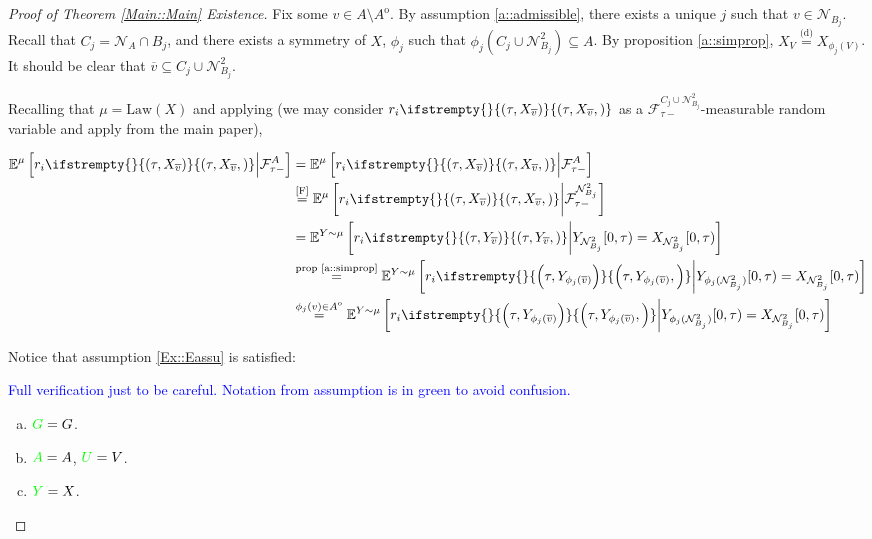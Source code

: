 \documentclass[12pt]{article}
\newcommand{\mb}{\mathbb}
\newcommand{\mc}{\mathcal}
\newcommand{\ov}{\overline}
\newcommand{\os}{\overset}
\newcommand{\te}{\text}
\newcommand{\tb}{\textcolor{blue}}
\newcommand{\tg}{\textcolor{green}}
\newcommand{\ind}{\hspace{24pt}}
\newcommand{\exmu}[2]{\mb{E}^{#1}\left[#2\right]}	%
\newcommand{\deq}{\overset{\text{(d)}}{=}}			%
\newcommand{\neigh}[1]{\mc{N}_{#1}}				%
\newcommand{\dneigh}[1]{\mc{N}^2_{#1}}			%
\newcommand{\cl}[1]{\ov{#1}}						%
\newcommand{\Xf}{X}									%
\newcommand{\rate}{r}								%
\newcommand{\F}{\mc{F}}								%
\newcommand{\m}{\mu}								%
\newcommand{\vind}[1]{_{#1}}						%
\newcommand{\tmi}[1]{#1}							%
\newcommand{\vpara}[1]{^{#1}}						%
\newcommand{\stpara}[1]{_{#1}}						%
\newcommand{\tpara}[1]{_{#1}}						%
\newcommand{\tmepro}[3]{
\ifstrempty{#3}{
	\left(#1,#2\right)}{
	\left(#1,#2,#3\right)}}							%
\newcommand{\Xg}{Y}									%
\newcommand{\inte}[1]{{#1}^\mathrm{o}}				%
\newcommand{\rt}{\tau}								%
\newcommand{\law}{\te{Law}}							%
\begin{document}
\begin{proof}[Proof of Theorem \ref{Main::Main} Existence]
\ind Fix some \(v \in A\setminus \inte{A}\). By assumption \ref{a::admissible}, there exists a unique \(j\) such that \(v \in \neigh{B_j}\). Recall that \(C_j = \neigh{A}\cap B_j\), and there exists a symmetry of \(\Xf\), \(\phi_j\) such that \(\phi_j(C_j\cup\dneigh{B_j}) \subseteq A\). By proposition \ref{a::simprop}, \(\Xf\vind{V} \deq \Xf\vind{\phi_j(V)}\). It should be clear that \(\cl{v} \subseteq C_j\cup\dneigh{B_j}\).

\ind Recalling that \(\m = \law(\Xf)\) and applying \cite[theorem \ref{F-CI::CI}]{F} (we may consider \(\rate\stpara{i}\tmepro{\rt}{\Xf\vind{\cl{v}}}{}\) as a \(\F\vpara{C_j\cup\dneigh{B_j}}\tpara{\rt-}\)-measurable random variable and apply \cite[lemma \ref{F-TL::Props}(e)]{F} from the main paper),

\begin{align*}
\exmu{\m}{\rate\stpara{i}\tmepro{\rt}{\Xf\vind{\cl{v}}}{}\middle|\F\vpara{A}\tpara{\rt-}} &=\exmu{\m}{\rate\stpara{i}\tmepro{\rt}{\Xf\vind{\cl{v}}}{}\middle|\F\vpara{A}\tpara{\rt-}}\\
&\os{\te{\cite[thm \ref{F-CI::CI}]{F}}}{=} \exmu{\m}{\rate\stpara{i}\tmepro{\rt}{\Xf\vind{\cl{v}}}{}\middle|\F\vpara{\dneigh{B_j}}\tpara{\rt-}}\\
&=\exmu{\Xg\sim \m}{\rate\stpara{i}\tmepro{\rt}{\Xg\vind{\cl{v}}}{}\middle|\Xg\vind{\dneigh{B_j}}\tmi{[0,\rt)} = \Xf\vind{\dneigh{B_j}}\tmi{[0,\rt)}}\\
&\os{\te{prop \ref{a::simprop}}}{=} \exmu{\Xg\sim \m}{\rate\stpara{i}\tmepro{\rt}{\Xg\vind{\phi_j(\cl{v})}}{}\middle|\Xg\vind{\phi_j(\dneigh{B_j})}\tmi{[0,\rt)} = \Xf\vind{\dneigh{B_j}}\tmi{[0,\rt)}}\\
&\os{\phi_j(v) \in \inte{A}}{=} \exmu{\Xg\sim \m}{\rate\stpara{i}\tmepro{\rt}{\Xg\vind{\phi_j(\cl{v})}}{}\middle|\Xg\vind{\phi_j(\dneigh{B_j})}\tmi{[0,\rt)} = \Xf\vind{\dneigh{B_j}}\tmi{[0,\rt)}}\\
\end{align*}

Notice that assumption \ref{Ex::Eassu} is satisfied:

\ind \tb{Full verification just to be careful. Notation from assumption is in green to avoid confusion.}

\begin{enumerate}[(a)]
\item \(\tg{G} = G\).

\item \(\tg{A} = A\), \(\tg{U} = V\).

\item \(\tg{Y} = \Xf\).


\end{enumerate}
\end{proof}
\end{document}
